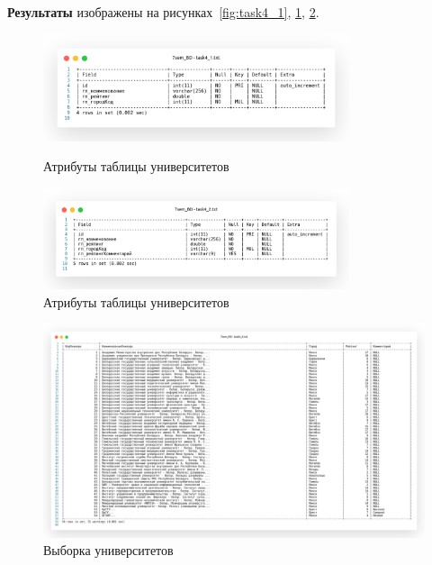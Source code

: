 

\textbf{Результаты} изображены на рисунках~\ref{fig:task4_1},
\ref{fig:task4_2}, \ref{fig:task4_4}.

\begin{figure}[!h]
  \centering

  \begin{minipage}{0.49\textwidth}
    \centering

    \includegraphics[width=9cm]
    {../sql/task4/task4_1.png}

    \caption{Атрибуты таблицы университетов}
    \label{fig:task4_1}
  \end{minipage}
  \begin{minipage}{0.49\textwidth}
    \centering

    \includegraphics[width=9cm]
    {../sql/task4/task4_2.png}

    \caption{Атрибуты таблицы университетов}
    \label{fig:task4_2}
  \end{minipage}
\end{figure}





\begin{figure}[!h]
  \centering

  \includegraphics[width=18cm]
  {../sql/task4/task4_4.png}

  \caption{Выборка университетов}

  \label{fig:task4_4}
\end{figure}

